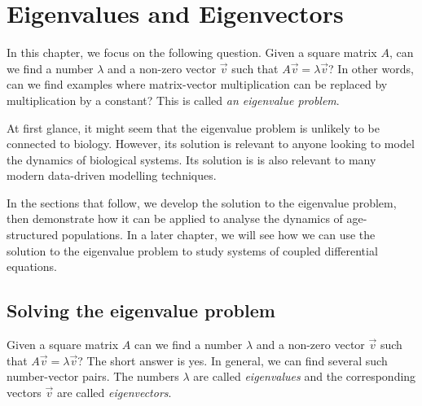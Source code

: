 \documentclass[../book.tex]{subfiles}
\begin{document}
\chapter{Eigenvalues and Eigenvectors}\label{ch:eig}

In this chapter, we focus on the following question. Given a square matrix \(A\), can we find a number \(\lambda\) and a non-zero vector \(\vec{v}\) such that \(A\vec{v} = \lambda \vec{v}\)?
In other words, can we find examples where matrix-vector multiplication can be replaced by multiplication by a constant? This is called \emph{an eigenvalue problem}.

At first glance, it might seem that the eigenvalue problem is unlikely to be connected to biology. However, its solution is relevant to anyone looking to model the dynamics of biological systems. Its solution is is also relevant to many modern data-driven modelling techniques.

In the sections that follow, we develop the solution to the eigenvalue problem, then demonstrate how it can be applied to analyse the dynamics of age-structured populations. In a later chapter, we will see how we can use the solution to the eigenvalue problem to study systems of coupled differential equations.

\section{Solving the eigenvalue problem}

Given a square matrix \(A\) can we find a number \(\lambda\) and a non-zero vector \(\vec{v}\) such that \(A \vec{v}= \lambda \vec{v}\)? The short answer is yes. In general, we can find several such number-vector pairs. The numbers \(\lambda\) are called \emph{eigenvalues} and the corresponding vectors \(\vec{v}\) are called \emph{eigenvectors}.
\end{document}
